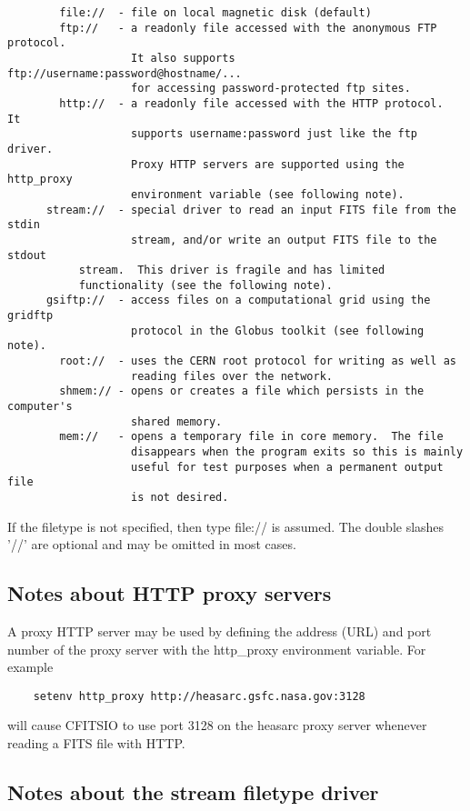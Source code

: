 \documentclass[11pt]{book}
\begin{document}
\begin{verbatim}
        file://  - file on local magnetic disk (default)
        ftp://   - a readonly file accessed with the anonymous FTP protocol.
                   It also supports  ftp://username:password@hostname/...
                   for accessing password-protected ftp sites.
        http://  - a readonly file accessed with the HTTP protocol.  It
                   supports username:password just like the ftp driver.
                   Proxy HTTP servers are supported using the http_proxy
                   environment variable (see following note).
      stream://  - special driver to read an input FITS file from the stdin
                   stream, and/or write an output FITS file to the stdout
		   stream.  This driver is fragile and has limited
		   functionality (see the following note).
      gsiftp://  - access files on a computational grid using the gridftp
                   protocol in the Globus toolkit (see following note).
        root://  - uses the CERN root protocol for writing as well as
                   reading files over the network.
        shmem:// - opens or creates a file which persists in the computer's
                   shared memory.
        mem://   - opens a temporary file in core memory.  The file
                   disappears when the program exits so this is mainly
                   useful for test purposes when a permanent output file
                   is not desired.
\end{verbatim}
If the filetype is not specified, then type file:// is assumed.
The double slashes '//' are optional and may be omitted in most cases.


\subsection{Notes about HTTP proxy servers}

A proxy HTTP server may be used by defining the address (URL) and port
number of the proxy server with the http\_proxy environment variable.
For example

\begin{verbatim}
    setenv http_proxy http://heasarc.gsfc.nasa.gov:3128
\end{verbatim}
will cause CFITSIO to use port 3128 on the heasarc proxy server whenever
reading a FITS file with HTTP.


\subsection{Notes about the stream filetype driver}
\end{document}
